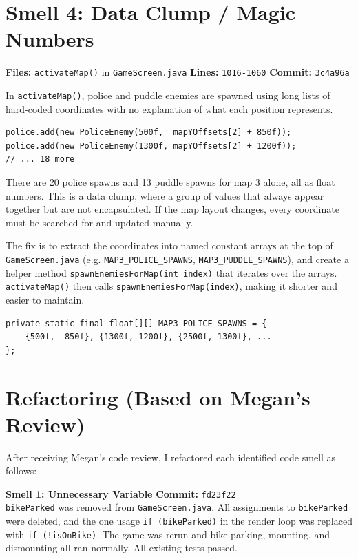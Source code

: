 \documentclass[10pt]{article}
\begin{document}
\section*{Smell 4: Data Clump / Magic Numbers}

\textbf{Files:} \texttt{activateMap()} in \texttt{GameScreen.java} \quad
\textbf{Lines:} \texttt{1016-1060} \quad
\textbf{Commit:} \texttt{3c4a96a}

In \texttt{activateMap()}, police and puddle enemies are spawned using long lists 
of hard-coded coordinates with no explanation of what each position represents.

\begin{lstlisting}
police.add(new PoliceEnemy(500f,  mapYOffsets[2] + 850f));
police.add(new PoliceEnemy(1300f, mapYOffsets[2] + 1200f));
// ... 18 more
\end{lstlisting}

There are 20 police spawns and 13 puddle spawns for map 3 alone, all as
float numbers. This is a data clump, where a group of values that always appear together 
but are not encapsulated. If the map layout changes, every coordinate must be 
searched for and updated manually.

The fix is to extract the coordinates into named constant arrays at the top of 
\texttt{GameScreen.java} (e.g. \texttt{MAP3\_POLICE\_SPAWNS}, \texttt{MAP3\_PUDDLE\_SPAWNS}), 
and create a  helper method \texttt{spawnEnemiesForMap(int index)} that 
iterates over the arrays. \texttt{activateMap()} then calls 
\texttt{spawnEnemiesForMap(index)}, making it shorter and easier to maintain.

\begin{lstlisting}
private static final float[][] MAP3_POLICE_SPAWNS = {
    {500f,  850f}, {1300f, 1200f}, {2500f, 1300f}, ...
};
\end{lstlisting}

\medskip


\section*{Refactoring 
(Based on Megan's Review)}
\smallskip

After receiving Megan's code review, I refactored each identified code smell as follows:

\textbf{Smell 1: Unnecessary Variable} \quad \textbf{Commit:} \texttt{fd23f22} \\
\texttt{bikeParked} was removed from \texttt{GameScreen.java}. All assignments 
to \texttt{bikeParked} were deleted, and the one usage \texttt{if (bikeParked)} 
in the render loop was replaced with \texttt{if (!isOnBike)}. The game was 
rerun and bike parking, mounting, and dismounting all ran normally. All existing tests passed.
\end{document}
